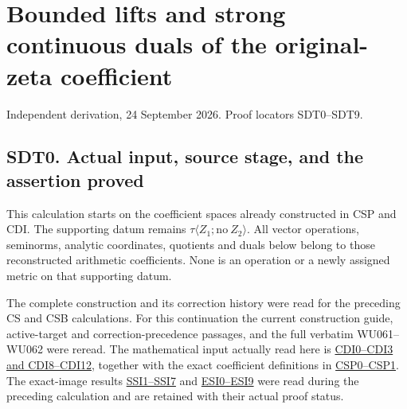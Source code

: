 \section{Bounded lifts and strong continuous duals of the original-zeta
coefficient}\label{bounded-lifts-and-strong-continuous-duals-of-the-original-zeta-coefficient}

Independent derivation, 24 September 2026. Proof locators SDT0--SDT9.

\subsection{SDT0. Actual input, source stage, and the assertion
proved}\label{sdt0.-actual-input-source-stage-and-the-assertion-proved}

This calculation starts on the coefficient spaces already constructed in
CSP and CDI. The supporting datum remains
\(\tau\langle Z_1;\mathrm{no}\ Z_2\rangle\). All vector operations,
seminorms, analytic coordinates, quotients and duals below belong to
those reconstructed arithmetic coefficients. None is an operation or a
newly assigned metric on that supporting datum.

The complete construction and its correction history were read for the
preceding CS and CSB calculations. For this continuation the current
construction guide, active-target and correction-precedence passages,
and the full verbatim WU061--WU062 were reread. The mathematical input
actually read here is
\href{https://github.com/KokunoYumeto/zeta-function-research-reader/blob/main/workbenches/splitzero-tandem/continuations/20260925-source-endpoint-and-section/CC_CONTINUOUS_DUAL_INDEPENDENT.md}{CDI0--CDI3
and CDI8--CDI12}, together with the exact coefficient definitions in
\href{https://github.com/KokunoYumeto/zeta-function-research-reader/blob/96b02efaf4511d07f33de5ea4cfb10058e905d7e/workbenches/splitzero-tandem/continuations/20260924-cohomology-weight-and-character-lifts/gct-weight-control/proofs/CC_SPHERE_PULLBACK_AND_NORMAL_DIRECTION.md}{CSP0--CSP1}.
The exact-image results
\href{https://github.com/KokunoYumeto/zeta-function-research-reader/blob/main/workbenches/splitzero-tandem/continuations/20260925-source-endpoint-and-section/EXACT_SCHWARTZ_SUMMATION_IMAGE.md}{SSI1--SSI7}
and
\href{https://github.com/KokunoYumeto/zeta-function-research-reader/blob/main/workbenches/splitzero-tandem/continuations/20260925-source-endpoint-and-section/EXACT_SCHWARTZ_IMAGE_INDEPENDENT_CHECK.md}{ESI0--ESI9}
were read during the preceding calculation and are retained with their
actual proof status.

